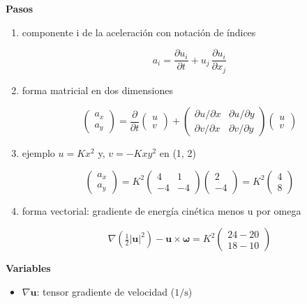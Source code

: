 \documentclass[10pt,openany]{book}
\begin{document}
\begin{tcolorbox}[title={Desarrollos del modelo}, studiumdef, breakable]
\noindent\textbf{Pasos}
\begin{enumerate}
\item
componente i de la aceleración con notación de índices

\[
a_i = \frac{\partial u_i}{\partial t} + u_j\,\frac{\partial u_i}{\partial x_j}
\]
\item
forma matricial en dos dimensiones

\[
\begin{pmatrix} a_x \\ a_y \end{pmatrix} = \frac{\partial}{\partial t}\begin{pmatrix} u \\ v \end{pmatrix} + \begin{pmatrix} \partial u/\partial x & \partial u/\partial y \\ \partial v/\partial x & \partial v/\partial y \end{pmatrix}\begin{pmatrix} u \\ v \end{pmatrix}
\]
\item
ejemplo \(u = K x^2\) y, \(v = -K x y^2\) en (1, 2)

\[
\begin{pmatrix} a_x \\ a_y \end{pmatrix} = K^{2}\begin{pmatrix} 4 & 1 \\ -4 & -4 \end{pmatrix}\begin{pmatrix} 2 \\ -4 \end{pmatrix} = K^{2}\begin{pmatrix} 4 \\ 8 \end{pmatrix}
\]
\item
forma vectorial: gradiente de energía cinética menos u por omega

\[
\nabla\!\left(\tfrac12|\mathbf{u}|^{2}\right) - \mathbf{u}\times\boldsymbol{\omega} = K^{2}\begin{pmatrix} 24 - 20 \\ 18 - 10 \end{pmatrix}
\]
\end{enumerate}

\noindent\textbf{Variables}
\begin{itemize}
\item $\nabla\mathbf{u}$: tensor gradiente de velocidad ($\mathrm{1/s}$)
\end{itemize}


\end{tcolorbox}
\end{document}
